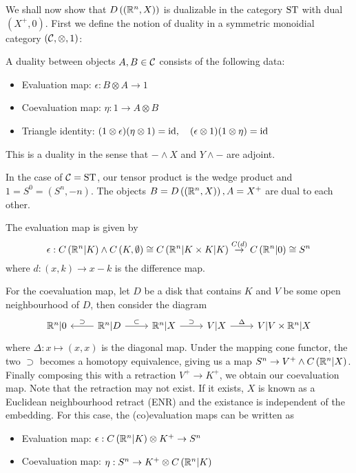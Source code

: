 We shall now show that $D\left(\left(\mathbb R^n,X\right)\right)$ is dualizable in the category $\operatorname{ST}$ with dual $\left(X^+,0\right)$. First we define the notion of duality in a symmetric monoidial category $\left(\mathcal C,\otimes,1\right)$:

A duality between objects $A,B\in \mathcal C$ consists of the following data:
\begin{itemize}
    \item Evaluation map: $\epsilon:B\otimes A\to 1$
    \item Coevaluation map: $\eta:1\to A\otimes B$
    \item Triangle identity: $(1\otimes\epsilon)(\eta\otimes1)=\operatorname{id},\quad(\epsilon\otimes1)(1\otimes\eta)=\operatorname{id}$
\end{itemize}

This is a duality in the sense that $-\wedge X$ and $Y\wedge-$ are adjoint.

In the case of $\mathcal C=\operatorname{ST}$, our tensor product is the wedge product and $1=S^0=\left(S^n,-n\right)$. The objects $B=D\left(\left(\mathbb R^n,X\right)\right),A=X^+$ are dual to each other.

The evaluation map is given by
\[\epsilon:C\left(\mathbb R^n|K\right)\wedge C\left(K,\emptyset\right)\cong C\left(\mathbb R^n|K\times K|K\right)\overset{C(d)}\to C\left(\mathbb R^n|0\right)\cong S^n\]
where $d:(x,k)\to x-k$ is the difference map.

For the coevaluation map, let $D$ be a disk that contains $K$ and $V$ be some open neighbourhood of $D$, then consider the diagram
\[\begin{tikzcd}
	{\mb R^n|0} & {\mb R^n|D} & {\mb R^n|X} & {V|X} & {V|V\times\mb R^n|X}
	\arrow["\supset"', from=1-2, to=1-1]
	\arrow["\subset", from=1-2, to=1-3]
	\arrow["\supset", from=1-3, to=1-4]
	\arrow["\Delta", from=1-4, to=1-5]
\end{tikzcd}\]
where $\Delta:x\mapsto(x,x)$ is the diagonal map. Under the mapping cone functor, the two $\supset$ becomes a homotopy equivalence, giving us a map $S^n\to V^+\wedge C\left(\mathbb R^n|X\right)$. Finally composing this with a retraction $V^+\to K^+$, we obtain our coevaluation map. Note that the retraction may not exist. If it exists, $X$ is known as a Euclidean neighbourhood retract (ENR) and the existance is independent of the embedding. For this case, the (co)evaluation maps can be written as

\begin{itemize}
    \item Evaluation map: $\epsilon:C\left(\mathbb R^n|K\right)\otimes K^+\to S^n$
    \item Coevaluation map: $\eta:S^n\to K^+\otimes C\left(\mathbb R^n|K\right)$
\end{itemize}

